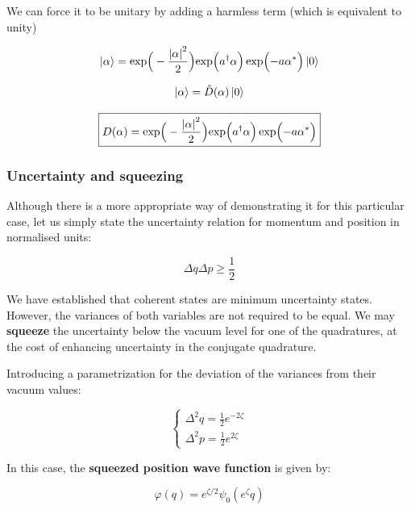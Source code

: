 \documentclass[12pt,a4paper]{report}
\begin{document}
We can force it to be unitary by adding a harmless term (which is equivalent to unity)

\begin{equation}
   \ket{\alpha}=\exp\Bigr(-\frac{\abs{\alpha}^2}{2}\Bigl)\exp\Bigl(a^{\dag}\alpha\Bigr)\exp\Bigl(-a\alpha^*\Bigr)\ket{0}
\end{equation}

\begin{equation}
   \ket{\alpha}=\hat D(\alpha)\ket{0}
\end{equation}


\begin{equation}
    \boxed{D(\alpha)=\exp\Bigr(-\frac{\abs{\alpha}^2}{2}\Bigl)\exp\Bigl(a^{\dag}\alpha\Bigr)\exp\Bigl(-a\alpha^*\Bigr)}
\end{equation}

\subsubsection{Uncertainty and squeezing}

Although there is a more appropriate way of demonstrating it for this particular case, let us simply state the uncertainty relation for momentum and position in normalised units:

\begin{equation}
    \Delta q \Delta p \ge \frac{1}{2}
\end{equation}

We have established that coherent states are minimum uncertainty states. However, the variances of both variables are not required to be equal. We may \textbf{squeeze} the uncertainty below the vacuum level for one of the quadratures, at the cost of enhancing uncertainty in the conjugate quadrature.

Introducing a parametrization for the deviation of the variances from their vacuum values:

\begin{equation}
    \begin{cases}
      \Delta ^2q=\frac{1}{2}e^{-2\zeta}\\
      \Delta ^2p=\frac{1}{2}e^{2\zeta}
    \end{cases}
\end{equation}

In this case, the \textbf{squeezed position wave function} is given by:

\begin{equation}
    \varphi (q) = e^{\zeta/2}\psi_0(e^{\zeta}q)
\end{equation}
\end{document}
